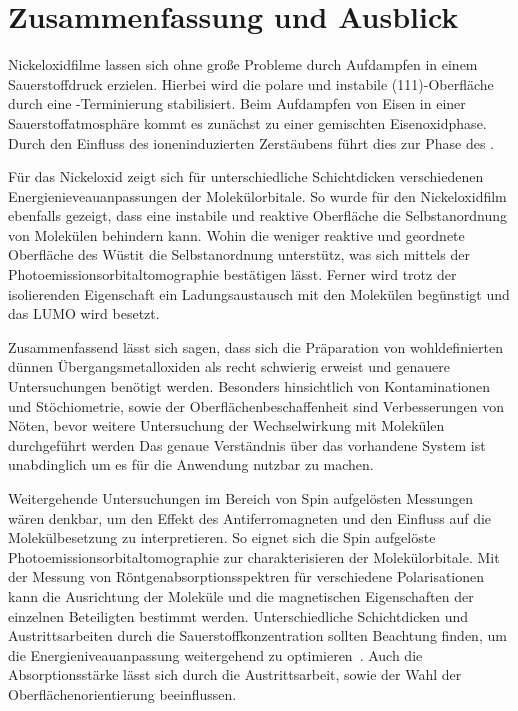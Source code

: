 \chapter{Zusammenfassung und Ausblick}
    Nickeloxidfilme lassen sich ohne große Probleme durch Aufdampfen in einem Sauerstoffdruck erzielen.
    Hierbei wird die polare und instabile (111)-Oberfläche durch eine -Terminierung stabilisiert.
    Beim Aufdampfen von Eisen in einer Sauerstoffatmosphäre kommt es zunächst zu einer gemischten Eisenoxidphase.
    Durch den Einfluss des ioneninduzierten Zerstäubens führt dies zur Phase des .
    
    Für das Nickeloxid zeigt sich für unterschiedliche Schichtdicken verschiedenen Energienieveauanpassungen der Molekülorbitale.
    So wurde für den Nickeloxidfilm ebenfalls gezeigt, dass eine instabile und reaktive Oberfläche die Selbstanordnung von Molekülen behindern kann.
    Wohin die weniger reaktive und geordnete Oberfläche des Wüstit die Selbstanordnung unterstütz, was sich mittels der Photoemissionsorbitaltomographie bestätigen lässt.
    Ferner wird trotz der isolierenden Eigenschaft ein Ladungsaustausch mit den Molekülen begünstigt und das LUMO wird besetzt.

    Zusammenfassend lässt sich sagen, dass sich die Präparation von wohldefinierten dünnen Übergangsmetalloxiden als recht schwierig erweist und genauere Untersuchungen benötigt werden.
    Besonders hinsichtlich von Kontaminationen und Stöchiometrie, sowie der Oberflächenbeschaffenheit sind Verbesserungen von Nöten, bevor weitere Untersuchung der Wechselwirkung mit Molekülen durchgeführt werden
    Das genaue Verständnis über das vorhandene System ist unabdinglich um es für die Anwendung nutzbar zu machen.

    Weitergehende Untersuchungen im Bereich von Spin aufgelösten Messungen wären denkbar, um den Effekt des Antiferromagneten und den Einfluss auf die Molekülbesetzung zu interpretieren.
    So eignet sich die Spin aufgelöste Photoemissionsorbitaltomographie zur charakterisieren der Molekülorbitale.
    Mit der Messung von Röntgenabsorptionsspektren für verschiedene Polarisationen kann die Ausrichtung der Moleküle und die magnetischen Eigenschaften der einzelnen Beteiligten bestimmt werden.
    Unterschiedliche Schichtdicken und Austrittsarbeiten durch die Sauerstoffkonzentration sollten Beachtung finden, um die Energieniveauanpassung weitergehend zu optimieren~\cite{IF_8}.
    Auch die Absorptionsstärke lässt sich durch die Austrittsarbeit, sowie der Wahl der Oberflächenorientierung beeinflussen.
